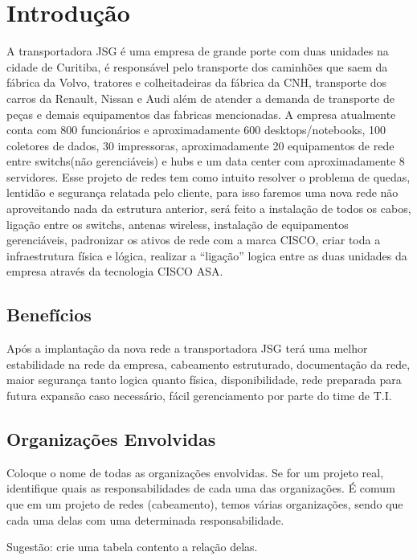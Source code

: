 \documentclass[	DIV=calc,%
							paper=a4,%
							fontsize=12pt,%
							onecolumn]{scrartcl}	 					%
\begin{document}
\section{Introdução}
	A transportadora JSG é uma empresa de grande porte com duas unidades na cidade de Curitiba, é responsável pelo transporte dos caminhões que saem da fábrica da Volvo, tratores e colheitadeiras da fábrica da CNH, transporte dos carros da Renault, Nissan e Audi além de atender a demanda de transporte de peças e demais equipamentos das fabricas mencionadas. 
	A empresa atualmente conta com 800 funcionários e aproximadamente 600 desktops/notebooks, 100 coletores de dados, 30 impressoras, aproximadamente 20 equipamentos de rede entre switchs(não gerenciáveis) e hubs e um data center com aproximadamente 8 servidores.
	Esse projeto de redes tem como intuito resolver o problema de quedas, lentidão e segurança relatada pelo cliente, para isso faremos uma nova rede não aproveitando nada da estrutura anterior, será feito a instalação de todos os cabos, ligação entre os switchs, antenas wireless, instalação de equipamentos gerenciáveis, padronizar os ativos de rede com a marca CISCO, criar toda a infraestrutura física e lógica, realizar a “ligação” logica entre as duas unidades da empresa através da tecnologia CISCO ASA.

\subsection{Benefícios}
Após a implantação da nova rede a transportadora JSG terá uma melhor estabilidade na rede da empresa, cabeamento estruturado, documentação da rede, maior segurança tanto logica quanto física, disponibilidade, rede preparada para futura expansão caso necessário, fácil gerenciamento por parte do time de T.I.

\subsection{Organizações Envolvidas}
Coloque o nome de todas as organizações envolvidas. Se for um projeto real, identifique quais as responsabilidades de cada uma das organizações. É comum que em um projeto de redes (cabeamento), temos várias organizações, sendo que cada uma delas com uma determinada responsabilidade.

Sugestão: crie uma tabela contento a relação delas.
\end{document}
